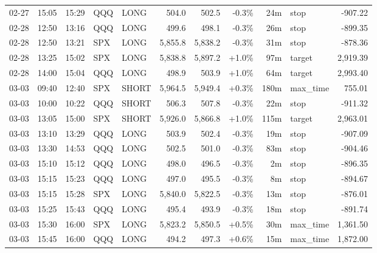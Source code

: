 \documentclass[11pt,a4paper,twoside]{article}
\begin{document}
\begin{center}
\begin{longtable}{>{\color{txtmain}}l l l l l r r r r >{\color{txtmain}}l r}
02-27 & 15:05 & 15:29 & QQQ & LONG & 504.0 & 502.5 & \textcolor{lossred}{-0.3\%} & 24m & stop & \textcolor{lossred}{-907.22} \\
02-28 & 12:50 & 13:16 & QQQ & LONG & 499.6 & 498.1 & \textcolor{lossred}{-0.3\%} & 26m & stop & \textcolor{lossred}{-899.35} \\
02-28 & 12:50 & 13:21 & SPX & LONG & 5,855.8 & 5,838.2 & \textcolor{lossred}{-0.3\%} & 31m & stop & \textcolor{lossred}{-878.36} \\
02-28 & 13:25 & 15:02 & SPX & LONG & 5,838.8 & 5,897.2 & \textcolor{wingreen}{+1.0\%} & 97m & target & \textcolor{wingreen}{2,919.39} \\
02-28 & 14:00 & 15:04 & QQQ & LONG & 498.9 & 503.9 & \textcolor{wingreen}{+1.0\%} & 64m & target & \textcolor{wingreen}{2,993.40} \\
03-03 & 09:40 & 12:40 & SPX & SHORT & 5,964.5 & 5,949.4 & \textcolor{wingreen}{+0.3\%} & 180m & max\_time & \textcolor{wingreen}{755.01} \\
03-03 & 10:00 & 10:22 & QQQ & SHORT & 506.3 & 507.8 & \textcolor{lossred}{-0.3\%} & 22m & stop & \textcolor{lossred}{-911.32} \\
03-03 & 13:05 & 15:00 & SPX & SHORT & 5,926.0 & 5,866.8 & \textcolor{wingreen}{+1.0\%} & 115m & target & \textcolor{wingreen}{2,963.01} \\
03-03 & 13:10 & 13:29 & QQQ & LONG & 503.9 & 502.4 & \textcolor{lossred}{-0.3\%} & 19m & stop & \textcolor{lossred}{-907.09} \\
03-03 & 13:30 & 14:53 & QQQ & LONG & 502.5 & 501.0 & \textcolor{lossred}{-0.3\%} & 83m & stop & \textcolor{lossred}{-904.46} \\
03-03 & 15:10 & 15:12 & QQQ & LONG & 498.0 & 496.5 & \textcolor{lossred}{-0.3\%} & 2m & stop & \textcolor{lossred}{-896.35} \\
03-03 & 15:15 & 15:23 & QQQ & LONG & 497.0 & 495.5 & \textcolor{lossred}{-0.3\%} & 8m & stop & \textcolor{lossred}{-894.67} \\
03-03 & 15:15 & 15:28 & SPX & LONG & 5,840.0 & 5,822.5 & \textcolor{lossred}{-0.3\%} & 13m & stop & \textcolor{lossred}{-876.01} \\
03-03 & 15:25 & 15:43 & QQQ & LONG & 495.4 & 493.9 & \textcolor{lossred}{-0.3\%} & 18m & stop & \textcolor{lossred}{-891.74} \\
03-03 & 15:30 & 16:00 & SPX & LONG & 5,823.2 & 5,850.5 & \textcolor{wingreen}{+0.5\%} & 30m & max\_time & \textcolor{wingreen}{1,361.50} \\
03-03 & 15:45 & 16:00 & QQQ & LONG & 494.2 & 497.3 & \textcolor{wingreen}{+0.6\%} & 15m & max\_time & \textcolor{wingreen}{1,872.00} \\

\end{longtable}
\end{center}
\end{document}
